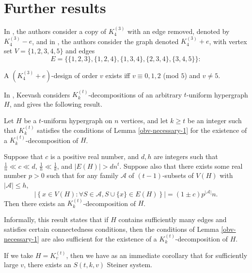 \section{Further results}

In \cite{feng-chang2}, the authors consider a copy of $K_4^{(3)}$ with an edge removed, denoted by $K_4^{(3)} - e$, and in \cite{feng-chang}, the authors consider the graph denoted $K_4^{(3)} + e$, with vertex set $V = \{1,2,3,4,5\}$ and edges \[E = \{\{1,2,3\},\{1,2,4\},\{1,3,4\},\{2,3,4\},\{3,4,5\}\}:\]

\begin{theorem}
A $(K_4^{(3)}+e)$-design of order $v$ exists iff $v \equiv 0,1,2$ (mod $5$) and $v \neq 5$.
\end{theorem}

In \cite{keevash}, Keevash considers $K_{k}^{(t)}$-decompositions of an arbitrary $t$-uniform hypergraph $H$, and gives the following result.

\begin{theorem}
Let $H$ be a $t$-uniform hypergraph on $n$ vertices, and let $k \geq t$ be an integer such that $K_{k}^{(t)}$ satisfies
the conditions of Lemma \ref{obv-necessary-1} for the existence of a $K_{k}^{(t)}$-decomposition of $H$.

Suppose that $c$ is a positive real number, and $d, h$ are integers such that $\frac{1}{n} \ll c \ll d$, $\frac{1}{h} \ll \frac{1}{k}$, and $|E(H)| > dn^t$. Suppose also that there exists some real number $p > 0$ such that for any family $\mathcal{A}$ of $(t-1)$-subsets of $V(H)$ with $|\mathcal{A}| \leq h$,
\[
    \left| \left\{ x \in V(H) : \forall S \in \mathcal{A}, S \cup \{x\} \in E(H) \right\} \right| = (1 \pm c) p^{|\mathcal{A}|} n.
\]
Then there exists an $K_{k}^{(t)}$-decomposition of $H$.
\end{theorem}

Informally, this result states that if $H$ contains sufficiently many edges and satisfies certain connectedness conditions, then the conditions of Lemma \ref{obv-necessary-1} are also sufficient for the existence of a $K_{k}^{(t)}$-decomposition of $H$.

If we take $H = K_{v}^{(t)}$, then we have as an immediate corollary that for sufficiently large $v$, there exists an $S(t, k, v)$ Steiner system.
